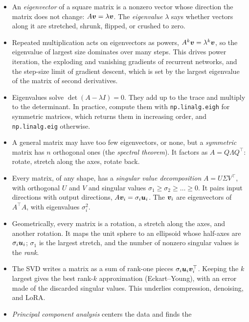 \begin{itemize}
  \item An \emph{eigenvector} of a square matrix is a nonzero vector whose
    direction the matrix does not change: $A\bm{v} = \lambda\bm{v}$.
    The \emph{eigenvalue} $\lambda$ says whether vectors along it are
    stretched, shrunk, flipped, or crushed to zero.
  \item Repeated multiplication acts on eigenvectors as powers,
    $A^k\bm{v} = \lambda^k\bm{v}$, so the eigenvalue of largest size
    dominates over many steps. This drives power iteration, the exploding
    and vanishing gradients of recurrent networks, and the step-size limit
    of gradient descent, which is set by the largest eigenvalue of the
    matrix of second derivatives.
  \item Eigenvalues solve $\det(A - \lambda I) = 0$. They add up to the
    trace and multiply to the determinant. In practice, compute them with
    \texttt{np.linalg.eigh} for symmetric matrices, which returns them in
    increasing order, and \texttt{np.linalg.eig} otherwise.
  \item A general matrix may have too few eigenvectors, or none, but a
    \emph{symmetric} matrix has $n$ orthogonal ones (the \emph{spectral
    theorem}). It factors as $A = Q\Lambda Q^\top$: rotate, stretch along
    the axes, rotate back.
  \item Every matrix, of any shape, has a \emph{singular value
    decomposition} $A = U\Sigma V^\top$, with orthogonal $U$ and $V$ and
    singular values $\sigma_1 \ge \sigma_2 \ge \dots \ge 0$. It pairs input
    directions with output directions, $A\bm{v}_i = \sigma_i\bm{u}_i$.
    The $\bm{v}_i$ are eigenvectors of $A^\top A$, with eigenvalues
    $\sigma_i^2$.
  \item Geometrically, every matrix is a rotation, a stretch along the
    axes, and another rotation. It maps the unit sphere to an ellipsoid
    whose half-axes are $\sigma_i \bm{u}_i$; $\sigma_1$ is the largest
    stretch, and the number of nonzero singular values is the
    \emph{rank}.
  \item The SVD writes a matrix as a sum of rank-one pieces
    $\sigma_i \bm{u}_i \bm{v}_i^\top$. Keeping the $k$ largest gives the
    best rank-$k$ approximation (Eckart--Young), with an error made of the
    discarded singular values. This underlies compression, denoising, and
    LoRA.
  \item \emph{Principal component analysis} centers the data and finds the

\end{itemize}
